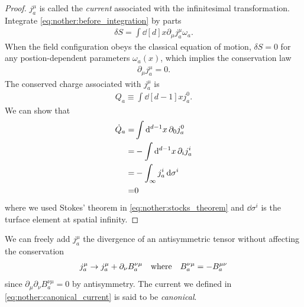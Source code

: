 \documentclass[10pt]{article}
\begin{document}
\begin{proof}
    $j^\mu_a$ is called the \textit{current} associated with the infinitesimal transformation.
    Integrate \cref{eq:nother:before_integration} by parts
    \begin{align}
        \delta S=\int\dd[d]{x}\partial_\mu j^\mu_a \omega_a.
    \end{align}
    When the field configuration obeys the classical equation of motion, $\delta S=0$ for any postion-dependent parameters $\omega_a(x)$, which implies the conservation law
    \begin{align}
        \partial_\mu j^\mu_a=0.
    \end{align}
    The conserved charge associated with $j^\mu_a$ is
    \begin{align}
        Q_a\equiv\int\dd[d-1]{x}j^0_a.
    \end{align}
    We can show that
    \begin{align}
        \dot{Q}_a= & \int\dd[d-1]{x}\partial_0 j^0_a\notag                            \\
        =          & -\int\dd[d-1]{x}\partial_i j^i_a\label{eq:nother:stocks_theorem} \\
        =          & -\int_\infty j^i_a\dd{\sigma^i}\notag                            \\
        =          & 0
    \end{align}
    where we used Stokes' theorem in \cref{eq:nother:stocks_theorem} and $\dd{\sigma^i}$ is the turface element at spatial infinity.
\end{proof}
\begin{remark}
    We can freely add $j^\mu_a$ the divergence of an antisymmetric tensor without affecting the conservation
    \begin{align}
        j^\mu_a\to j^\mu_a+\partial_\nu B^{\nu\mu}_a\qq{where} B^{\nu\mu}_a=-B^{\mu\nu}_a\label{eq:nother:equiv_current}
    \end{align}
    since $\partial_\mu\partial_\nu B^{\nu\mu}_a=0$ by antisymmetry.
    The current we defined in \cref{eq:nother:canonical_current} is said to be \textit{canonical}.
\end{remark}
\end{document}
